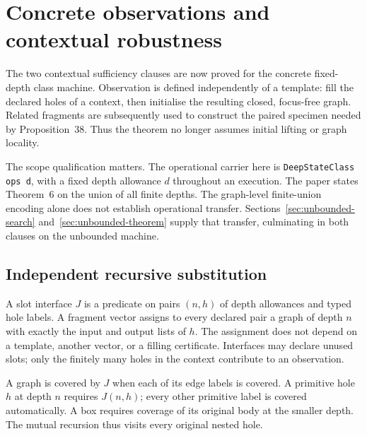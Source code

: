 \section{Concrete observations and contextual robustness}
\label{sec:concrete-observations}
The two contextual sufficiency clauses are now proved for the concrete
fixed-depth class machine. Observation is defined independently of a template:
fill the declared holes of a context, then initialise the resulting closed,
focus-free graph. Related fragments are subsequently used to construct the
paired specimen needed by Proposition~38. Thus the theorem no longer assumes
initial lifting or graph locality.

The scope qualification matters. The operational carrier here is
\texttt{DeepStateClass ops d}, with a fixed depth allowance $d$ throughout an
execution. The paper states Theorem~6 on the union of all finite depths.
The graph-level finite-union encoding alone does not establish operational transfer. Sections~\ref{sec:unbounded-search} and~\ref{sec:unbounded-theorem} supply that transfer, culminating in both clauses on the unbounded machine.

\subsection{Independent recursive substitution}
\begin{definition}
A slot interface $J$ is a predicate on pairs $(n,h)$ of depth allowances and typed hole labels. A fragment vector assigns to every declared pair a graph of depth $n$ with exactly the input and output lists of $h$. The assignment does not depend on a template, another vector, or a filling certificate. Interfaces may declare unused slots; only the finitely many holes in the context contribute to an observation.
\end{definition}

\begin{definition}
A graph is covered by $J$ when each of its edge labels is covered. A primitive hole $h$ at depth $n$ requires $J(n,h)$; every other primitive label is covered automatically. A box requires coverage of its original body at the smaller depth. The mutual recursion thus visits every original nested hole.
\end{definition}

